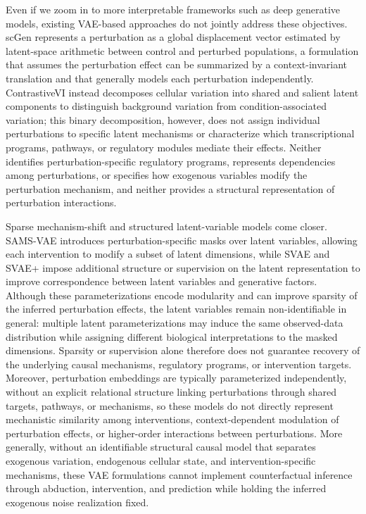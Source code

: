 Even if we zoom in to more interpretable frameworks such as deep generative models, existing
VAE-based approaches do not jointly address these objectives. scGen\cite{lotfollahi2019scgen}
represents a perturbation as a global displacement vector estimated by latent-space arithmetic
between control and perturbed populations{, a formulation that assumes} the perturbation effect can be
summarized by a context-invariant translation and {that} generally models each perturbation
independently. ContrastiveVI\cite{weinberger2023contrastivevi} {instead }decomposes cellular variation
into shared and salient latent components to distinguish background variation from
condition-associated variation{; this binary decomposition, however,} does not assign individual
perturbations to specific latent mechanisms or characterize which transcriptional programs, pathways,
or regulatory modules mediate their effects. {Neither identifies perturbation-specific regulatory
programs, represents dependencies among perturbations, or specifies how exogenous variables modify
the perturbation mechanism, and neither provides a structural representation of perturbation
interactions.}

{Sparse mechanism-shift and structured latent-variable models come closer.}
SAMS-VAE\cite{bereket2023samsvae} introduces perturbation-specific masks over latent variables,
allowing each intervention to modify a subset of latent dimensions{, while
SVAE\cite{lachapelle2022mechanism} and SVAE+\cite{lopez2023sviaeplus} impose additional structure or
supervision on the latent representation to improve correspondence between latent variables and
generative factors}. Although {these parameterizations} encode modularity and can improve sparsity of
the inferred perturbation effects, the latent variables remain non-identifiable in general: multiple
latent parameterizations may induce the same observed-data distribution while assigning different
biological interpretations to the masked dimensions. Sparsity {or supervision }alone therefore does not
guarantee recovery of the underlying causal mechanisms, regulatory programs, or intervention targets.
Moreover, perturbation embeddings are typically {parameterized independently, without} an explicit
relational structure linking perturbations through shared targets, pathways, or mechanisms{, so these
models} do not directly represent mechanistic similarity among interventions, context-dependent
modulation of perturbation effects, or higher-order interactions between perturbations. More
generally, without an identifiable structural causal model that separates exogenous variation,
endogenous cellular state, and intervention-specific mechanisms, these VAE formulations cannot
implement counterfactual inference through abduction, intervention, and prediction while holding the
inferred exogenous noise realization fixed.

